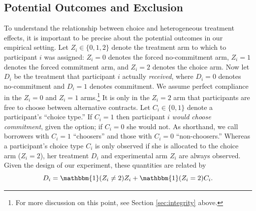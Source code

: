 \documentclass[oneside,11pt]{article}
\begin{document}
\subsection{Potential Outcomes and Exclusion}
\label{sec:potentialOutcomes}

To understand the relationship between choice and heterogeneous treatment effects, it is important to be precise about the potential outcomes in our empirical setting.
Let $Z_i \in \{0, 1, 2\}$ denote the treatment arm to which to participant $i$ was assigned: $Z_i = 0$ denotes the forced no-commitment arm, $Z_i = 1$ denotes the forced commitment arm, and $Z_i = 2$ denotes the choice arm. 
Now let $D_i$ be the treatment that participant $i$ actually \emph{received}, where $D_i = 0$ denotes no-commitment and $D_i = 1$ denotes commitment. 
We assume perfect compliance in the $Z_i = 0$ and $Z_i = 1$ arms.\footnote{For more discussion on this point, see Section \ref{sec:integrity} above.}
It is only in the $Z_i = 2$ arm that participants are free to choose between alternative contracts. 
Let $C_i \in \{0, 1 \}$ denote a participant's ``choice type.'' If $C_i = 1$ then participant $i$ \emph{would choose commitment}, given the option; if $C_i = 0$ she would not. 
As shorthand, we call borrowers with $C_i = 1$ ``choosers'' and those with $C_i = 0$ ``non-choosers.''
Whereas a participant's choice type $C_i$ is only observed if she is allocated to the choice arm ($Z_i = 2$), her treatment $D_i$ and experimental arm $Z_i$ are always observed. 
Given the design of our experiment, these quantities are related by
\begin{equation}
D_i = \mathbbm{1}(Z_i \neq 2) Z_i + \mathbbm{1}(Z_i = 2) C_i.
\label{eq:potentialTreatments}
\end{equation}
\end{document}
